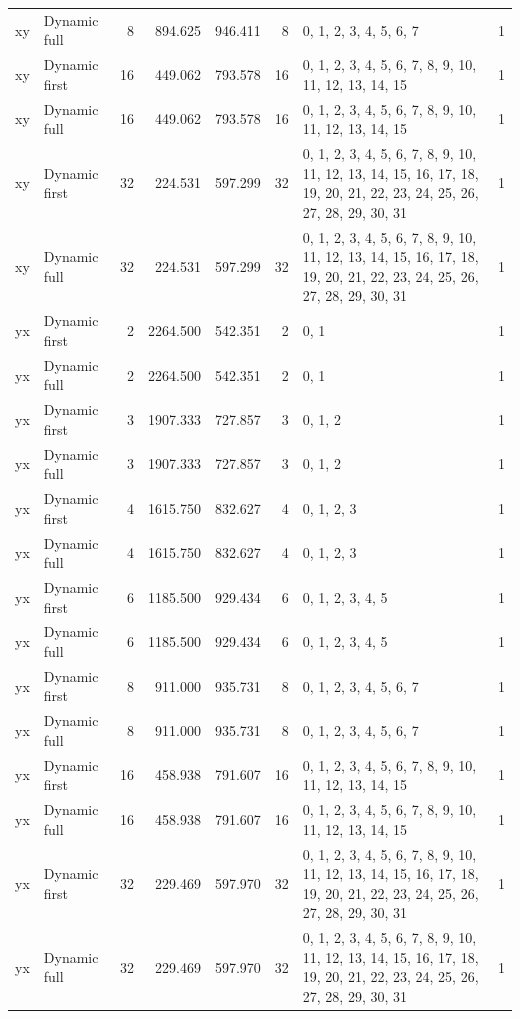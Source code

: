 \documentclass[10pt,a4paper]{article}
\begin{document}
\begin{longtable}{@{}p{23mm}p{29mm}rrrrp{36mm}r@{}}
xy & Dynamic full & 8 & 894.625 & 946.411 & 8 & 0, 1, 2, 3, 4, 5, 6, 7 & 1 \\
xy & Dynamic first & 16 & 449.062 & 793.578 & 16 & 0, 1, 2, 3, 4, 5, 6, 7, 8, 9, 10, 11, 12, 13, 14, 15 & 1 \\
xy & Dynamic full & 16 & 449.062 & 793.578 & 16 & 0, 1, 2, 3, 4, 5, 6, 7, 8, 9, 10, 11, 12, 13, 14, 15 & 1 \\
xy & Dynamic first & 32 & 224.531 & 597.299 & 32 & 0, 1, 2, 3, 4, 5, 6, 7, 8, 9, 10, 11, 12, 13, 14, 15, 16, 17, 18, 19, 20, 21, 22, 23, 24, 25, 26, 27, 28, 29, 30, 31 & 1 \\
xy & Dynamic full & 32 & 224.531 & 597.299 & 32 & 0, 1, 2, 3, 4, 5, 6, 7, 8, 9, 10, 11, 12, 13, 14, 15, 16, 17, 18, 19, 20, 21, 22, 23, 24, 25, 26, 27, 28, 29, 30, 31 & 1 \\
yx & Dynamic first & 2 & 2264.500 & 542.351 & 2 & 0, 1 & 1 \\
yx & Dynamic full & 2 & 2264.500 & 542.351 & 2 & 0, 1 & 1 \\
yx & Dynamic first & 3 & 1907.333 & 727.857 & 3 & 0, 1, 2 & 1 \\
yx & Dynamic full & 3 & 1907.333 & 727.857 & 3 & 0, 1, 2 & 1 \\
yx & Dynamic first & 4 & 1615.750 & 832.627 & 4 & 0, 1, 2, 3 & 1 \\
yx & Dynamic full & 4 & 1615.750 & 832.627 & 4 & 0, 1, 2, 3 & 1 \\
yx & Dynamic first & 6 & 1185.500 & 929.434 & 6 & 0, 1, 2, 3, 4, 5 & 1 \\
yx & Dynamic full & 6 & 1185.500 & 929.434 & 6 & 0, 1, 2, 3, 4, 5 & 1 \\
yx & Dynamic first & 8 & 911.000 & 935.731 & 8 & 0, 1, 2, 3, 4, 5, 6, 7 & 1 \\
yx & Dynamic full & 8 & 911.000 & 935.731 & 8 & 0, 1, 2, 3, 4, 5, 6, 7 & 1 \\
yx & Dynamic first & 16 & 458.938 & 791.607 & 16 & 0, 1, 2, 3, 4, 5, 6, 7, 8, 9, 10, 11, 12, 13, 14, 15 & 1 \\
yx & Dynamic full & 16 & 458.938 & 791.607 & 16 & 0, 1, 2, 3, 4, 5, 6, 7, 8, 9, 10, 11, 12, 13, 14, 15 & 1 \\
yx & Dynamic first & 32 & 229.469 & 597.970 & 32 & 0, 1, 2, 3, 4, 5, 6, 7, 8, 9, 10, 11, 12, 13, 14, 15, 16, 17, 18, 19, 20, 21, 22, 23, 24, 25, 26, 27, 28, 29, 30, 31 & 1 \\
yx & Dynamic full & 32 & 229.469 & 597.970 & 32 & 0, 1, 2, 3, 4, 5, 6, 7, 8, 9, 10, 11, 12, 13, 14, 15, 16, 17, 18, 19, 20, 21, 22, 23, 24, 25, 26, 27, 28, 29, 30, 31 & 1 \\
\end{longtable}\normalsize\setlength{\tabcolsep}{6pt}
\clearpage
\end{document}
